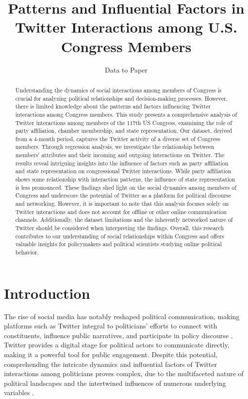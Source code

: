 \documentclass[11pt]{article}
\title{Patterns and Influential Factors in Twitter Interactions among U.S. Congress Members}
\author{Data to Paper}
\begin{document}
\maketitle
\begin{abstract}
Understanding the dynamics of social interactions among members of Congress is crucial for analyzing political relationships and decision-making processes. However, there is limited knowledge about the patterns and factors influencing Twitter interactions among Congress members. This study presents a comprehensive analysis of Twitter interactions among members of the 117th US Congress, examining the role of party affiliation, chamber membership, and state representation. Our dataset, derived from a 4-month period, captures the Twitter activity of a diverse set of Congress members. Through regression analysis, we investigate the relationship between members' attributes and their incoming and outgoing interactions on Twitter. The results reveal intriguing insights into the influence of factors such as party affiliation and state representation on congressional Twitter interactions. While party affiliation shows some relationship with interaction patterns, the influence of state representation is less pronounced. These findings shed light on the social dynamics among members of Congress and underscore the potential of Twitter as a platform for political discourse and networking. However, it is important to note that this analysis focuses solely on Twitter interactions and does not account for offline or other online communication channels. Additionally, the dataset limitations and the inherently networked nature of Twitter should be considered when interpreting the findings. Overall, this research contributes to our understanding of social relationships within Congress and offers valuable insights for policymakers and political scientists studying online political behavior.
\end{abstract}
\section*{Introduction}

The rise of social media has notably reshaped political communication, making platforms such as Twitter integral to politicians' efforts to connect with constituents, influence public narratives, and participate in policy discourse \cite{Larsson2014OfCW, Stier2018ElectionCO, Kreiss2018InTO, Enli2013PERSONALIZEDCI}. Twitter provides a digital stage for political actors to communicate directly, making it a powerful tool for public engagement. Despite this potential, comprehending the intricate dynamics and influential factors of Twitter interactions among politicians proves complex, due to the multifaceted nature of political landscapes and the intertwined influences of numerous underlying variables \cite{Hua2020CharacterizingTU}.
\end{document}
